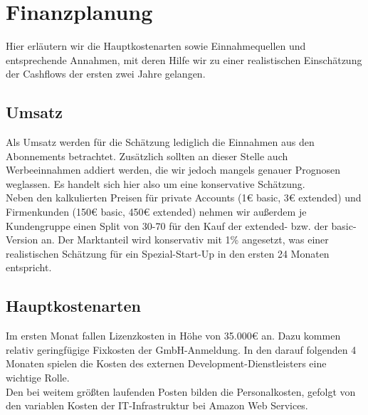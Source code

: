 
\section{Finanzplanung}
Hier erläutern wir die Hauptkostenarten sowie Einnahmequellen und entsprechende Annahmen, mit deren Hilfe wir zu einer realistischen Einschätzung der Cashflows der ersten zwei Jahre gelangen.
\subsection{Umsatz}
Als Umsatz werden für die Schätzung lediglich die Einnahmen aus den Abonnements betrachtet. Zusätzlich sollten an dieser Stelle auch Werbeeinnahmen addiert werden, die wir jedoch mangels genauer Prognosen weglassen. Es handelt sich hier also um eine konservative Schätzung.\\
Neben den kalkulierten Preisen für private Accounts (1\euro{} basic, 3\euro{} extended) und Firmenkunden (150\euro{} basic, 450\euro{} extended) nehmen wir außerdem je Kundengruppe einen Split von 30-70 für den Kauf der extended- bzw. der basic-Version an. Der Marktanteil wird konservativ mit 1\% angesetzt, was einer realistischen Schätzung für ein Spezial-Start-Up in den ersten 24 Monaten entspricht.
\subsection{Hauptkostenarten}
Im ersten Monat fallen Lizenzkosten in Höhe von 35.000\euro{} an. Dazu kommen relativ geringfügige Fixkosten der GmbH-Anmeldung. In den darauf folgenden 4 Monaten spielen die Kosten des externen Development-Dienstleisters eine wichtige Rolle. \\
Den bei weitem größten laufenden Posten bilden die Personalkosten, gefolgt von den variablen Kosten der IT-Infrastruktur bei Amazon Web Services. 


